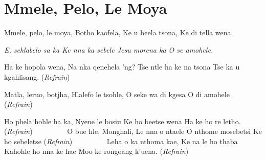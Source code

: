 \starttocol
\chapter{Mmele, Pelo, Le Moya}
\nexttocol
\hfill{\it }
\stoptocol
\starttocol
\startlines
{\sc Mmele}, pelo, le moya, 
Botho kaofela, 
Ke u beela tsona, 
Ke di tella  wena.

{\it E, sehlabelo sa ka
Ke nna ka sebele
Jesu morena ka
O se amohele.}

Ha ke hopola wena,
Na nka qenehela 'ng?
Tse ntle ha ke na tsona
Tse ka u kgahlisang.         \hfill({\it Refrain})~~~~~~~~~

Matla, leruo, botjha, 
Hlalefo le tsohle,
O seke wa di kgesa
O di amohele         \hfill({\it Refrain})~~~~~~~~~

Ho phela hohle ha ka, 
Nyene le bosiu
Ke ho beetse wena
Ha ke ho re letho.          \hfill({\it Refrain})~~~~~~~~~
\stoplines
\nexttocol
\stoptocol
\starttocol
\startlines
O bue hle, Monghali,
Le nna o ntaele
O nthome mosebetsi
Ke ho sebeletse         \hfill({\it Refrain})~~~~~~~~~
\stoplines
\nexttocol
\stoptocol
\starttocol
\startlines
Leha o ka nthoma kae,
Ke na le ho thaba
Kahohle ho nna ke hae
Moo ke rongoang k'uena.        \hfill({\it Refrain})~~~~~~~~~
\stoplines
\nexttocol

\stoptocol
